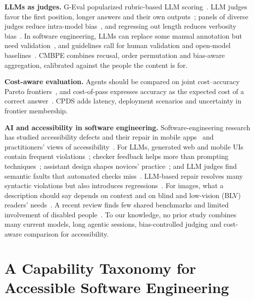 \documentclass[10pt,conference]{IEEEtran}
\begin{document}
\textbf{LLMs as judges.} G-Eval popularized rubric-based LLM scoring~\cite{liu2023geval}. LLM judges favor the first position, longer answers and their own outputs~\cite{zheng2023judging,wang2024fair,panickssery2024self}; panels of diverse judges reduce intra-model bias~\cite{verga2024juries}, and regressing out length reduces verbosity bias~\cite{dubois2024lcalpaca}. In software engineering, LLMs can replace some manual annotation but need validation~\cite{ahmed2025annotation}, and guidelines call for human validation and open-model baselines~\cite{baltes2025guidelines,sallou2024breaking}. CMBPE combines recusal, order permutation and bias-aware aggregation, calibrated against the people the content is for.

\textbf{Cost-aware evaluation.} Agents should be compared on joint cost--accuracy Pareto frontiers~\cite{kapoor2025agents}, and cost-of-pass expresses accuracy as the expected cost of a correct answer~\cite{erol2026costofpass}. CPDS adds latency, deployment scenarios and uncertainty in frontier membership.

\textbf{AI and accessibility in software engineering.} Software-engineering research has studied accessibility defects and their repair in mobile apps~\cite{alshayban2020android,chen2020unblind} and practitioners' views of accessibility~\cite{bi2022practice}. For LLMs, generated web and mobile UIs contain frequent violations~\cite{aljedaani2024chatgpt,gurita2025perpetuates,rabelo2025mobile,kreer2026webaccessbench}; checker feedback helps more than prompting techniques~\cite{suh2025human}; assistant design shapes novices' practice~\cite{mowar2025codea11y}; and LLM judges find semantic faults that automated checks miss~\cite{calo2026semantic}. LLM-based repair resolves many syntactic violations but also introduces regressions~\cite{fathallah2025accessguru,oyelayo2026repair,wanscher2026blind}. For images, what a description should say depends on context and on blind and low-vision (BLV) readers' needs~\cite{stangl2021going,kreiss2022context,kreiss2024contextref,mohanbabu2024context}. A recent review finds few shared benchmarks and limited involvement of disabled people~\cite{aljedaani2026slr}. To our knowledge, no prior study combines many current models, long agentic sessions, bias-controlled judging and cost-aware comparison for accessibility.

\section{A Capability Taxonomy for Accessible Software Engineering}\label{sec:taxonomy}
\end{document}
